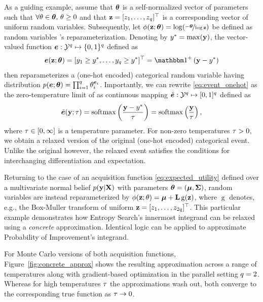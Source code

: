 As a guiding example, assume that \(\boldsymbol{\theta}\) is a self-normalized vector of \parallelism{} parameters such that \(\forall \theta \in \boldsymbol{\theta},\, \theta \ge 0\) and that \(\mathbf{z} = [z_{1},\ldots,z_{q}]^\top\) is a corresponding vector of uniform random variables. 
% 
Subsequently, let \(\phi(\mathbf{z}; \boldsymbol{\theta}) = \log(\nicefrac{-\boldsymbol{\theta}}{\log \mathbf{z}})\) be defined as random variables \Y's reparameterization. Denoting by \(y^{*} = \max(\mathbf{y})\), the vector-valued function \(\boldsymbol{e} : \mathcal{Y}^{q}\mapsto \{0, 1\}^{q}\) defined as
\begin{align}
\events(\Z; \rparams)
	= \T{[\y_{1} \ge \opt{\y},\ldots, \y_{\parallelism} \ge \opt{\y}]}
    = \heaviside^{+}\left(\Y - \opt{\y}\right)
\label{eq:event_onehot}
\end{align}
then reparameterizes a (one-hot encoded) categorical random variable \events{} having distribution \(p(\boldsymbol{e}; \boldsymbol{\theta}) = \prod\nolimits_{i=1}^{q} \theta_{i}^{\boldsymbol{e}_{i}}\). Importantly, we can rewrite \eqref{eq:event_onehot} as the zero-temperature limit of as continuous mapping \(\tilde{\boldsymbol{e}} : \mathcal{Y}^{q} \mapsto [0, 1]^{q}\) defined as 
\begin{align}
\tilde{\boldsymbol{e}}(\mathbf{y}; \tau)
    = \operatorname{softmax}\left(\frac{\mathbf{y} - y^{*}}{\tau}\right)
    = \operatorname{softmax}\left(\frac{\mathbf{y}}{\tau}\right),
\label{eq:event_softmax}
\end{align}
where \(\tau \in [0, \infty]\) is a temperature parameter. For non-zero temperatures \(\tau > 0\), we obtain a relaxed version of the original (one-hot encoded) categorical event. Unlike the original however, the relaxed event satisfies the conditions for interchanging differentiation and expectation.

Returning to the case of an acquisition function \eqref{eq:expected_utility} defined over a multivariate normal belief \(p(\mathbf{y}|\mathbf{X})\) with parameters \(\boldsymbol{\theta} = (\boldsymbol{\mu},\boldsymbol{\Sigma})\), random variables \Y{} are instead reparameterized by \(\phi(\mathbf{z}; \theta) = \boldsymbol{\mu} + \mathbf{L} \operatorname{g}(\mathbf{z})\), where \(\operatorname{g}\) denotes, e.g., the Box-Muller transform of uniform \rvs{} \(\mathbf{z} = [z_{1},\ldots,z_{2q}]^\top\). 
% 
This particular example demonstrates how Entropy Search's innermost integrand can be relaxed using a \emph{concrete} approximation. Identical logic can be applied to approximate Probability of Improvement's integrand. 

For Monte Carlo versions of both acquisition functions, Figure~\ref{fig:concrete_approx} shows the resulting approximation across a range of temperatures along with gradient-based optimization in the parallel setting \(q = 2\). Whereas for high temperatures \(\tau\) the approximations wash out, both converge to the corresponding true function as \(\tau \to 0\).


